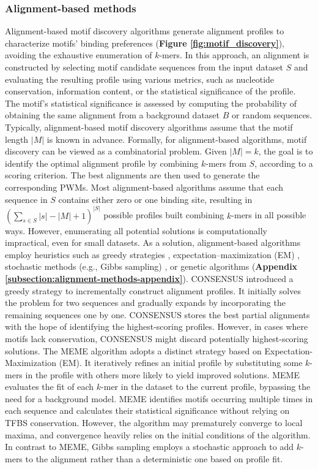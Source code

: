\documentclass[a4paper, titlepage, openright]{book}
\begin{document}
\subsubsection{Alignment-based methods}
Alignment-based motif discovery algorithms generate alignment profiles to characterize motifs' binding preferences (\textbf{Figure \ref{fig:motif_discovery}}), avoiding the exhaustive enumeration of $k$-mers. In this approach, an alignment is constructed by selecting motif candidate sequences from the input dataset $S$ and evaluating the resulting profile using various metrics, such as nucleotide conservation, information content, or the statistical significance of the profile. The motif's statistical significance is assessed by computing the probability of obtaining the same alignment from a background dataset $B$ or random sequences. Typically, alignment-based motif discovery algorithms assume that the motif length $|M|$ is known in advance. Formally, for alignment-based algorithms, motif discovery can be viewed as a combinatorial problem. Given $|M| = k$, the goal is to identify the optimal alignment profile by combining $k$-mers from $S$, according to a scoring criterion. The best alignments are then used to generate the corresponding PWMs. Most alignment-based algorithms assume that each sequence in $S$ contains either zero or one binding site, resulting in $(\sum_{s \in S}{|s| - |M| + 1})^{|S|}$ possible profiles built combining $k$-mers in all possible ways. However, enumerating all potential solutions is computationally impractical, even for small datasets. As a solution, alignment-based algorithms employ heuristics such as greedy strategies \citep{hertz1999identifying}, expectation–maximization (EM) \citep{bailey1994fitting}, stochastic methods (e.g., Gibbs sampling) \citep{lawrence1993detecting}, or genetic algorithms \citep{lee2018comprehensive} (\textbf{Appendix \ref{subsection:alignment-methods-appendix}}). CONSENSUS \citep{hertz1999identifying} introduced a greedy strategy to incrementally construct alignment profiles. It initially solves the problem for two sequences and gradually expands by incorporating the remaining sequences one by one. CONSENSUS stores the best partial alignments with the hope of identifying the highest-scoring profiles. However, in cases where motifs lack conservation, CONSENSUS might discard potentially highest-scoring solutions. The MEME algorithm \citep{bailey1994fitting,bailey1995value,bailey2006meme} adopts a distinct strategy based on Expectation-Maximization (EM). It iteratively refines an initial profile by substituting some $k$-mers in the profile with others more likely to yield improved solutions. MEME evaluates the fit of each $k$-mer in the dataset to the current profile, bypassing the need for a background model. MEME identifies motifs occurring multiple times in each sequence and calculates their statistical significance without relying on TFBS conservation. However, the algorithm may prematurely converge to local maxima, and convergence heavily relies on the initial conditions of the algorithm. In contrast to MEME, Gibbs sampling \citep{lawrence1990expectation} employs a stochastic approach to add $k$-mers to the alignment rather than a deterministic one based on profile fit. 
\end{document}
